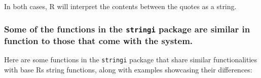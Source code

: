 \documentclass[
]{article}
\begin{document}
In both cases, R will interpret the contents between the quotes as a
string.

\hypertarget{some-of-the-functions-in-the-stringi-package-are-similar-in-function-to-those-that-come-with-the-system}{%
\subsubsection{\texorpdfstring{Some of the functions in the
\texttt{stringi} package are similar in function to those that come with
the
system.}{Some of the functions in the stringi package are similar in function to those that come with the system.}}\label{some-of-the-functions-in-the-stringi-package-are-similar-in-function-to-those-that-come-with-the-system}}

Here are some functions in the \texttt{stringi} package that share
similar functionalities with base R\textquotesingle s string functions,
along with examples showcasing their differences:
\end{document}
